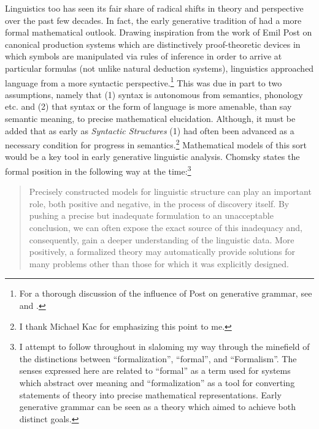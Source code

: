 \documentclass[output=paper]{langscibook}
\begin{document}
Linguistics too has seen its fair share of radical shifts in theory and perspective over the past few decades. In fact, the early generative tradition of \cite{Chomsky1957} had a more formal mathematical outlook. Drawing inspiration from the work of Emil Post on canonical production systems which are distinctively proof-theoretic devices in which symbols are manipulated via rules of inference in order to arrive at particular formulas (not unlike natural deduction systems), linguistics approached language from a more syntactic perspective.\footnote{For a thorough discussion of the influence of Post on generative grammar, see \cite{Pullum2011} and \cite{Lobina2017}.} This was due in part to two assumptions, namely that (1) syntax is autonomous from semantics, phonology etc. and (2) that syntax or the form of language is more amenable, than say semantic meaning, to precise mathematical elucidation. Although, it must be added that as early as \textit{Syntactic Structures} (1) had often been advanced as a necessary condition for progress in semantics.\footnote{I thank Michael Kac for emphasizing this point to me.} Mathematical models of this sort would be a key tool in early generative linguistic analysis. Chomsky states the formal position in the following way at the time:\footnote{I attempt to follow \cite{Pullum2007} throughout in slaloming my way through the minefield of the distinctions between ``formalization'', ``formal'', and ``Formalism''. The senses expressed here are related to ``formal'' as a term used for systems which abstract over meaning and ``formalization'' as a tool for converting statements of theory into precise mathematical representations. Early generative grammar can be seen as a theory which aimed to achieve both distinct goals.} 

\begin{quote}
Precisely constructed models for linguistic structure can play an important role, both positive and negative, in the process of discovery itself. By pushing a precise but inadequate formulation to an unacceptable conclusion, we can often expose the exact source of this inadequacy and, consequently, gain a deeper understanding of the linguistic data. More positively, a formalized theory may automatically provide solutions for many problems other than those for which it was explicitly designed. \citep[5]{Chomsky1957}
\end{quote}
\end{document}
